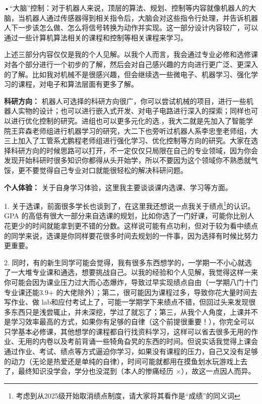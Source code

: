 \documentclass[11pt,oneside]{book}
\begin{document}
\vspace{10pt}

•“大脑”控制：对于机器人来说，顶层的算法、规划、控制等内容就像机器人的大脑，当机器人通过传感器得到相关指令后，大脑会对这些指令行处理，并告诉机器人下一步该怎么做、怎么将信号转换为动作并实现。这一部分设计内容较广，可以通过一些计算机算法相关的课程和控制等相关课程来学习。

\vspace{10pt}

上述三部分内容仅仅是我的个人见解。以我个人而言，我会通过专业必修和选修课对各个部分进行一个初步的了解，然后会对自己感兴趣的方向进行更广泛、更深入的了解。比如我对机械不是很感兴趣，但会继续选一些微电子、机器学习、强化学习的课程，对电子和算法层面有更多了解。

\vspace{10pt}

\textbf{科研方向：}
机器人可选择的科研方向很广，你可以尝试机械的项目，进行一些机器人实物的设计；也可以进行嵌入式开发、对电子电路进行深入的探索；同样也可以进行优化控制的研究。进组也可以更多元化的选.，我大二就是先加入了智能学院王弈森老师组进行机器学习的研究，大二下也旁听过机器人系李忠奎老师组，大三上加入了工管系尤鹏程老师组进行强化学习、优化控制等方向的研究。大家在选择科研方向的时候思路可以打开，不一定仅仅只局限在自己的专业领域，因为你会发现开始科研时很多知识你都得从头开始学，所以不要因为这个领域你不熟悉就气馁，更不要觉得自己专业对口就能很轻松的解决科研问题。

\vspace{10pt}

\textbf{个人体验：}
关于自身学习体验，这里我主要谈谈课内选课、学习等方面。

\vspace{10pt}

1. 关于选课，前面很多学长也谈到了，在这里我还想说一点我关于绩点\footnote{考虑到从2025级开始取消绩点制度，请大家将其看作是“成绩”的同义词}的认识。GPA 的高低有很大一部分来自选课的规划，比如你选了一门好课，可能你比别人花更少的时间就能拿到更不错的分数。这样说可能有点功利，但对于较为看中绩点的同学来说，选课是你同样要花很多时间去规划的一件事，因为选择有时候比努力更重要。

\vspace{10pt}

2. 同时，有的新生同学可能会觉得，我有很多东西想学的，一学期一不小心就选了一大堆专业课和通选，想要挑战自己。以我的经验和个人见解，我觉得这样一来你可能会因为课业压力过大而心态爆炸，导致过早实现绩点自由（一学期八门十门专业课还能3.9+ 的大佬除外）；第二，很可能因为课程过多，导致你花大量时间去写作业、做 lab和应付考试上了，可能一学期学下来绩点不错，但回过头来发现很多东西只是浅尝辄止，并未深挖，学过了就忘了；第三，从我个人角度，上课并不是学习效率最高的方式，如果你有足够的自律（这个前提很重要！），你完全可以只学基本必修课，其他想学的课程都自行找资料学习，这样可以省去很多无用的作业、无用的内卷以及考前背诵一些犄角旮旯的东西的时间。但说实话我觉得上课会通过作业、考试、绩点等方式逼迫你学习，如果没有课程的压力，自己又没有足够的动力（无论是热爱还是单纯的自律），时间可能就都用在摸鱼划水玩游戏上去了，最终知识没学会，学分也没混到（本人的惨痛经历 ×），故这一点因人而异。
\end{document}
